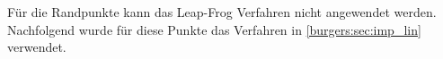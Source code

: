 	F\"ur die Randpunkte kann das Leap-Frog Verfahren nicht angewendet werden.
	Nachfolgend wurde f\"ur diese Punkte das Verfahren in \autoref{burgers:sec:imp_lin} verwendet.

